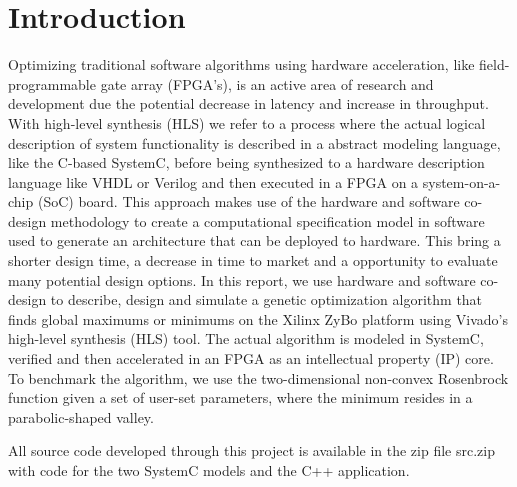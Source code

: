 \section{Introduction}
Optimizing traditional software algorithms using hardware acceleration, like field-programmable gate array (FPGA's), is an active area of research and development due the potential decrease in latency and increase in throughput. With high-level synthesis (HLS) we refer to a process where the actual logical description of system functionality is described in a abstract modeling language, like the C-based SystemC, before being synthesized to a hardware description language like VHDL or Verilog and then executed in a FPGA on a system-on-a-chip (SoC) board. This approach makes use of the hardware and software co-design methodology to create a computational specification model in software used to generate an architecture that can be deployed to hardware. This bring a shorter design time, a decrease in time to market and a opportunity to evaluate many potential design options. In this report, we use hardware and software co-design to describe, design and simulate a genetic optimization algorithm that finds global maximums or minimums on the Xilinx ZyBo platform using Vivado's high-level synthesis (HLS) tool. The actual algorithm is modeled in SystemC, verified and then accelerated in an FPGA as an intellectual property (IP) core. To benchmark the algorithm, we use the two-dimensional non-convex Rosenbrock function\cite{Shang2006} given a set of user-set parameters, where the minimum resides in a parabolic-shaped valley.

All source code developed through this project is available in the zip file src.zip with code for the two SystemC models and the C++ application.